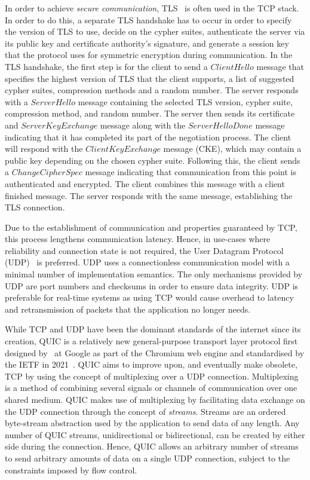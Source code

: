 In order to achieve \textit{secure communication}, TLS~\citep{rescorla_transport_2018} is often used in the TCP stack.
In order to do this, a separate TLS handshake has to occur in order to specify the version of TLS to use, decide on the cypher suites, authenticate the server via its public key and certificate authority's signature, and generate a session key that the protocol uses for symmetric encryption during communication.
In the TLS handshake, the first step is for the client to send a $ClientHello$ message that specifies the highest version of TLS that the client supports, a list of suggested cypher suites, compression methods and a random number.
The server responds with a $ServerHello$ message containing the selected TLS version, cypher suite, compression method, and random number.
The server then sends its certificate and $ServerKeyExchange$ message along with the $ServerHelloDone$ message indicating that it has completed its part of the negotiation process.
The client will respond with the $ClientKeyExchange$ message (CKE), which may contain a public key depending on the chosen cypher suite.
Following this, the client sends a $ChangeCipherSpec$ message indicating that communication from this point is authenticated and encrypted.
The client combines this message with a client finished message.
The server responds with the same message, establishing the TLS connection.

Due to the establishment of communication and properties guaranteed by TCP, this process lengthens communication latency.
Hence, in use-cases where reliability and connection state is not required, the User Datagram Protocol (UDP)~\citep{j_postel_1980} is preferred.
UDP uses a connectionless communication model with a minimal number of implementation semantics.
The only mechanisms provided by UDP are port numbers and checksums in order to ensure data integrity.
UDP is preferable for real-time systems as using TCP would cause overhead to latency and retransmission of packets that the application no longer needs.

While TCP and UDP have been the dominant standards of the internet since its creation, QUIC is a relatively new general-purpose transport layer protocol first designed by~\citet{jim_roskind_2012} at Google as part of the Chromium web engine and standardised by the IETF in 2021~\citep{iyengar_quic_2021}.
QUIC aims to improve upon, and eventually make obsolete, TCP by using the concept of multiplexing over a UDP connection.
Multiplexing is a method of combining several signals or channels of communication over one shared medium.
QUIC makes use of multiplexing by facilitating data exchange on the UDP connection through the concept of \textit{streams}.
Streams are an ordered byte-stream abstraction used by the application to send data of any length.
Any number of QUIC streams, unidirectional or bidirectional, can be created by either side during the connection.
Hence, QUIC allows an arbitrary number of streams to send arbitrary amounts of data on a single UDP connection, subject to the constraints imposed by flow control.

